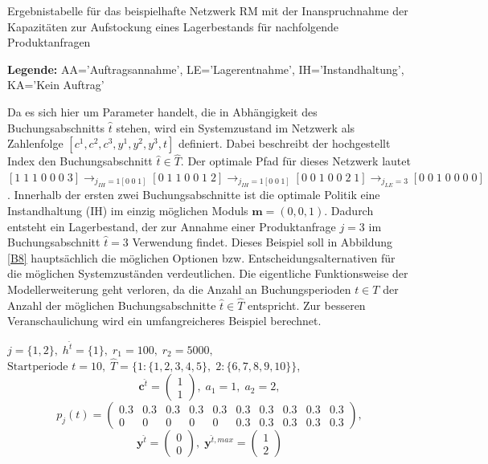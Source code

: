 \begin{table}
\begin{footnotesize}
    \caption{Ergebnistabelle für das beispielhafte Netzwerk RM mit der Inanspruchnahme der Kapazitäten zur Aufstockung eines Lagerbestands für nachfolgende Produktanfragen} \label{Tab8}
    \vspace*{3mm}
    \begin{center}
      \end{center}
    \begin{center}
          {\footnotesize \textbf{Legende:} AA='Auftragsannahme', LE='Lagerentnahme', IH='Instandhaltung', KA='Kein Auftrag'} 
      \end{center}
\end{footnotesize}
\end{table}

Da es sich hier um Parameter handelt, die in Abhängigkeit des Buchungsabschnitts $\hat{t}$ stehen, wird ein Systemzustand im Netzwerk als Zahlenfolge $[c^1,c^2,c^3,y^1,y^2,y^3,t]$ definiert. Dabei beschreibt der hochgestellt Index den Buchungsabschnitt $\hat{t}\in\hat{T}$. Der optimale Pfad für dieses Netzwerk lautet $[1\;1\;1\;0\;0\;0\;3] \rightarrow_{j_{IH}=1[0\;0\;1]} [0\;1\;1\;0\;0\;1\;2] \rightarrow_{j_{IH}=1[0\;0\;1]}  [0\;0\;1\;0\;0\;2\;1]  \rightarrow_{j_{LE}=3} [0\;0\;1\;0\;0\;0\;0]$. Innerhalb der ersten zwei Buchungsabschnitte ist die optimale Politik eine Instandhaltung (IH) im einzig möglichen Moduls $\textbf{m}=(0,0,1)$. Dadurch entsteht ein Lagerbestand, der zur Annahme einer Produktanfrage $j=3$ im Buchungsabschnitt $\hat{t}=3$ Verwendung findet. Dieses Beispiel soll in Abbildung \ref{B8} hauptsächlich die möglichen Optionen bzw. Entscheidungsalternativen für die möglichen Systemzuständen verdeutlichen. Die eigentliche Funktionsweise der Modellerweiterung geht verloren, da die Anzahl an Buchungsperioden $t\in T$ der Anzahl der möglichen Buchungsabschnitte $\hat{t}\in\hat{T}$ entspricht. Zur besseren Veranschaulichung wird ein umfangreicheres Beispiel berechnet.
\begin{center}
$j = \{1, 2\}, \; h^{\hat{t}} = \{1\}, \; r_{1} = 100, \; r_{2} = 5000,$ \\
$\text{Startperiode } t=10, \; \hat{T}= \{1: \{1,2,3,4,5\},\; 2: \{6,7,8,9,10\}\}  $,
\[\textbf{c}^{\hat{t}}=\begin{pmatrix} 1\\ 1  \end{pmatrix}, \;
    a_{1}=1, \;
       a_{2}=2,   \]
         \[ p_{j}(t)=
       \begin{pmatrix}
       0.3 & 0.3 & 0.3 & 0.3 & 0.3 & 0.3 & 0.3 & 0.3 & 0.3 & 0.3\\
0 & 0 & 0 & 0 & 0 & 0.3 & 0.3 & 0.3 & 0.3 & 0.3
\end{pmatrix}, 
  \]
  \[
    \textbf{y}^{\hat{t}}= \begin{pmatrix} 0\\ 0\end{pmatrix}, \;
    \textbf{y}^{\hat{t},max}=\begin{pmatrix} 1\\ 2  \end{pmatrix}
      \]
\end{center}

